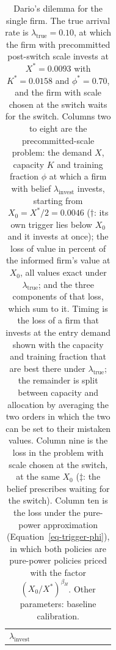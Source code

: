 \documentclass[
  11pt,
  letterpaper,
]{scrartcl}
\begin{document}
\begin{longtable}[]{@{}
  >{\raggedright\arraybackslash}p{}
  >{\raggedleft\arraybackslash}p{}
  >{\raggedleft\arraybackslash}p{}
  >{\raggedleft\arraybackslash}p{}
  >{\raggedleft\arraybackslash}p{}
  >{\raggedleft\arraybackslash}p{}
  >{\raggedleft\arraybackslash}p{}
  >{\raggedleft\arraybackslash}p{}
  >{\raggedleft\arraybackslash}p{}
  >{\raggedleft\arraybackslash}p{}@{}}
\caption{Dario's dilemma for the single firm. The true arrival rate is
\(\lambda_{\text{true}} = 0.10\), at which the firm with precommitted
post-switch scale invests at \(X^* = 0.0093\) with \(K^* = 0.0158\) and
\(\phi^* = 0.70\), and the firm with scale chosen at the switch waits
for the switch. Columns two to eight are the precommitted-scale problem:
the demand \(X\), capacity \(K\) and training fraction \(\phi\) at which
a firm with belief \(\lambda_{\text{invest}}\) invests, starting from
\(X_0 = X^*/2 = 0.0046\) (\(\dagger\): its own trigger lies below
\(X_0\) and it invests at once); the loss of value in percent of the
informed firm's value at \(X_0\), all values exact under
\(\lambda_{\text{true}}\); and the three components of that loss, which
sum to it. Timing is the loss of a firm that invests at the entry demand
shown with the capacity and training fraction that are best there under
\(\lambda_{\text{true}}\); the remainder is split between capacity and
allocation by averaging the two orders in which the two can be set to
their mistaken values. Column nine is the loss in the problem with scale
chosen at the switch, at the same \(X_0\) (\(\ddagger\): the belief
prescribes waiting for the switch). Column ten is the loss under the
pure-power approximation (Equation~\ref{eq-trigger-phi}), in which both
policies are pure-power policies priced with the factor
\((X_0/X^*)^{\beta_H}\). Other parameters: baseline
calibration.}\label{tbl-dilemma}\tabularnewline
\toprule\noalign{}
\begin{minipage}[b]{\linewidth}\raggedright
\(\lambda_{\text{invest}}\)
\end{minipage} & \begin{minipage}[b]{\linewidth}\raggedleft

\end{minipage}
\end{longtable}
\end{document}
